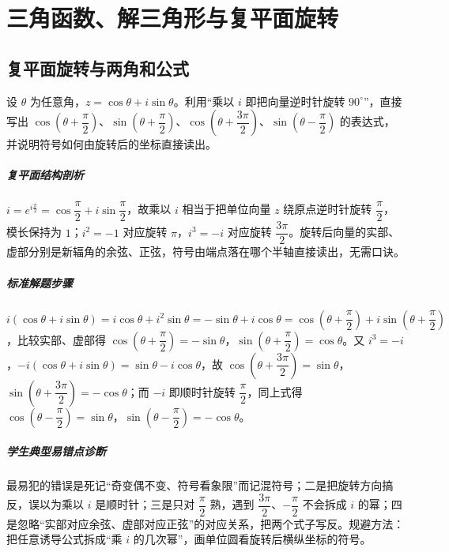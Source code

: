 \chapter{三角函数、解三角形与复平面旋转}

\section{复平面旋转与两角和公式}

\begin{problem}
设 $\theta$ 为任意角，$z=\cos\theta+i\sin\theta$。利用“乘以 $i$ 即把向量逆时针旋转 $90^\circ$”，直接写出 $\cos\left(\theta+\dfrac{\pi}{2}\right)$、$\sin\left(\theta+\dfrac{\pi}{2}\right)$、$\cos\left(\theta+\dfrac{3\pi}{2}\right)$、$\sin\left(\theta-\dfrac{\pi}{2}\right)$ 的表达式，并说明符号如何由旋转后的坐标直接读出。
\end{problem}
\begin{solution}
\paragraph{复平面结构剖析}
$i=e^{i\frac{\pi}{2}}=\cos\dfrac{\pi}{2}+i\sin\dfrac{\pi}{2}$，故乘以 $i$ 相当于把单位向量 $z$ 绕原点逆时针旋转 $\dfrac{\pi}{2}$，模长保持为 $1$；$i^2=-1$ 对应旋转 $\pi$，$i^3=-i$ 对应旋转 $\dfrac{3\pi}{2}$。旋转后向量的实部、虚部分别是新辐角的余弦、正弦，符号由端点落在哪个半轴直接读出，无需口诀。
\paragraph{标准解题步骤}
$i(\cos\theta+i\sin\theta)=i\cos\theta+i^2\sin\theta=-\sin\theta+i\cos\theta=\cos\left(\theta+\dfrac{\pi}{2}\right)+i\sin\left(\theta+\dfrac{\pi}{2}\right)$，比较实部、虚部得 $\cos\left(\theta+\dfrac{\pi}{2}\right)=-\sin\theta$，$\sin\left(\theta+\dfrac{\pi}{2}\right)=\cos\theta$。又 $i^3=-i$，$-i(\cos\theta+i\sin\theta)=\sin\theta-i\cos\theta$，故 $\cos\left(\theta+\dfrac{3\pi}{2}\right)=\sin\theta$，$\sin\left(\theta+\dfrac{3\pi}{2}\right)=-\cos\theta$；而 $-i$ 即顺时针旋转 $\dfrac{\pi}{2}$，同上式得 $\cos\left(\theta-\dfrac{\pi}{2}\right)=\sin\theta$，$\sin\left(\theta-\dfrac{\pi}{2}\right)=-\cos\theta$。
\paragraph{学生典型易错点诊断}
最易犯的错误是死记“奇变偶不变、符号看象限”而记混符号；二是把旋转方向搞反，误以为乘以 $i$ 是顺时针；三是只对 $\dfrac{\pi}{2}$ 熟，遇到 $\dfrac{3\pi}{2}$、$-\dfrac{\pi}{2}$ 不会拆成 $i$ 的幂；四是忽略“实部对应余弦、虚部对应正弦”的对应关系，把两个式子写反。规避方法：把任意诱导公式拆成“乘 $i$ 的几次幂”，画单位圆看旋转后横纵坐标的符号。
\end{solution}

